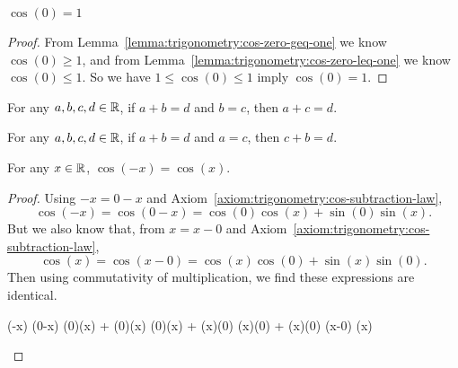 \begin{proposition}\label{prop:trigonometry:cos-of-zero-is-one}
$\cos(0) = 1$
\end{proposition}
\begin{proof}
  From Lemma~\ref{lemma:trigonometry:cos-zero-geq-one} we know
  $\cos(0)\geq1$, and from
  Lemma~\ref{lemma:trigonometry:cos-zero-leq-one} we know
  $\cos(0)\leq1$. So we have $1\leq\cos(0)\leq1$ imply $\cos(0)=1$.
\end{proof}

\begin{lemma}\label{lemma:equality:substitute-summand-for-equal-term}
For any $a,b,c,d\in\mathbb{R}$, if $a+b=d$ and $b=c$, then $a+c=d$.
\end{lemma}

\begin{lemma}\label{lemma:equality:substitute-left-summand-for-equal-term}
For any $a,b,c,d\in\mathbb{R}$, if $a+b=d$ and $a=c$, then $c+b=d$.
\end{lemma}

\begin{proposition}\label{prop:cosine-is-even}
For any $x\in\mathbb{R}$, $\cos(-x) = \cos(x)$.
\end{proposition}
\begin{proof}
Using $-x=0-x$ and Axiom~\ref{axiom:trigonometry:cos-subtraction-law},
\begin{equation}
\cos(-x) = \cos(0 - x) = \cos(0)\cos(x) + \sin(0)\sin(x).
\end{equation}
But we also know that, from $x=x-0$ and Axiom~\ref{axiom:trigonometry:cos-subtraction-law},
\begin{equation}
\cos(x) = \cos(x - 0) = \cos(x)\cos(0) + \sin(x)\sin(0).
\end{equation}
Then using commutativity of multiplication, we find these expressions
are identical.
\begin{calculation}
  \cos(-x)
  \cos(0-x)
  \cos(0)\cos(x) + \sin(0)\sin(x)
  \cos(0)\cos(x) + \sin(x)\sin(0)
  \cos(x)\cos(0) + \sin(x)\sin(0)
  \cos(x-0)
  \cos(x)\qedhere
\end{calculation}
\end{proof}

